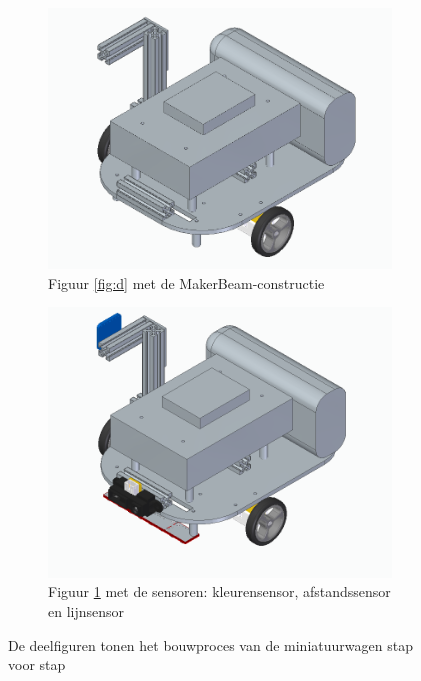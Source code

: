 \documentclass[a4paper,kulak]{kulakarticle}
\begin{document}
\begin{figure}
\begin{subfigure}[b]{0.475\textwidth}
		\includegraphics[width=\textwidth]{5.PNG}
		\caption[]%
		{{\small Figuur \ref{fig:d} met de MakerBeam-constructie}}    
		\label{fig:e}
	\end{subfigure}
	\hfill
	\begin{subfigure}[b]{0.475\textwidth}   
		\centering 
		\includegraphics[width=\textwidth]{6.PNG}
		\caption[]%
		{{\small Figuur \ref{fig:e} met de sensoren: kleurensensor, afstandssensor en lijnsensor}}    
		\label{fig:f}
	\end{subfigure}
	\caption
	{\small De deelfiguren tonen het bouwproces van de miniatuurwagen stap voor stap } 
	\label{fig:deelfiguren}
\end{figure}
\end{document}
